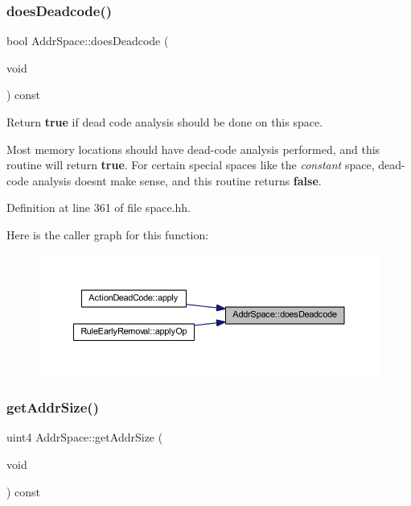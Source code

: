 \subsubsection{\texorpdfstring{doesDeadcode()}{doesDeadcode()}}
{\footnotesize\ttfamily bool Addr\+Space\+::does\+Deadcode (\begin{DoxyParamCaption}\item[{void}]{ }\end{DoxyParamCaption}) const\hspace{0.3cm}{\ttfamily [inline]}}



Return {\bfseries{true}} if dead code analysis should be done on this space. 

Most memory locations should have dead-\/code analysis performed, and this routine will return {\bfseries{true}}. For certain special spaces like the {\itshape constant} space, dead-\/code analysis doesn\textquotesingle{}t make sense, and this routine returns {\bfseries{false}}. 

Definition at line 361 of file space.\+hh.

Here is the caller graph for this function\+:
\nopagebreak
\begin{figure}[H]
\begin{center}
\leavevmode
\includegraphics[width=350pt]{class_addr_space_ad21df4bc27001b5bb1f98fdff8e3decc_icgraph}
\end{center}
\end{figure}
\mbox{\label{class_addr_space_aa4217d683f1de141406d009dc4364874}} 
\subsubsection{\texorpdfstring{getAddrSize()}{getAddrSize()}}
{\footnotesize\ttfamily uint4 Addr\+Space\+::get\+Addr\+Size (\begin{DoxyParamCaption}\item[{void}]{ }\end{DoxyParamCaption}) const\hspace{0.3cm}{\ttfamily [inline]}}



